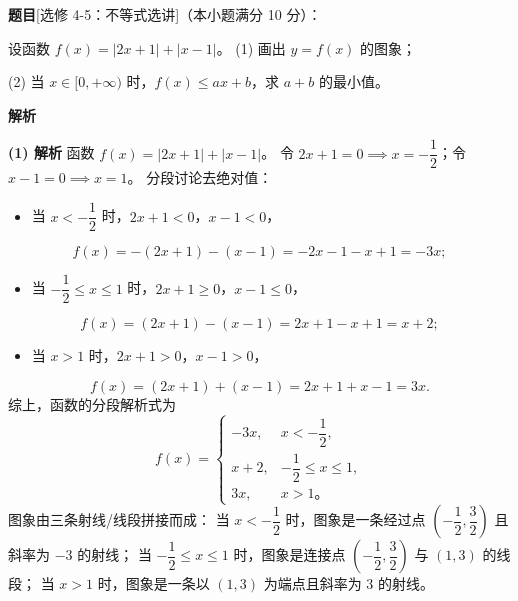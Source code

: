 \begin{answer}

\textbf{题目}[选修 4-5：不等式选讲]（本小题满分 10 分）：

设函数 $f(x) = |2x + 1| + |x - 1|$。
(1) 画出 $y = f(x)$ 的图象；
\nopagebreak[4]
\begin{center}\end{center}
\nopagebreak[4]
(2) 当 $x \in [0, +\infty)$ 时，$f(x) \leqslant ax + b$，求 $a + b$ 的最小值。

\textbf{解析}

\textbf{(1) 解析} 函数 $f(x) = |2x + 1| + |x - 1|$。
令 $2x + 1 = 0 \implies x = -\dfrac12$；令 $x - 1 = 0 \implies x = 1$。
分段讨论去绝对值：
\begin{itemize}
\item 当 $x < -\dfrac12$ 时，$2x + 1 < 0$，$x - 1 < 0$，
\end{itemize}
\nopagebreak[4]
\[f(x) = -(2x + 1) - (x - 1) = -2x - 1 - x + 1 = -3x;\]
\begin{itemize}
\item 当 $-\dfrac12 \leqslant x \leqslant 1$ 时，$2x + 1 \geqslant 0$，$x - 1 \leqslant 0$，
\end{itemize}
\nopagebreak[4]
\[f(x) = (2x + 1) - (x - 1) = 2x + 1 - x + 1 = x + 2;\]
\begin{itemize}
\item 当 $x > 1$ 时，$2x + 1 > 0$，$x - 1 > 0$，
\end{itemize}
\nopagebreak[4]
\[f(x) = (2x + 1) + (x - 1) = 2x + 1 + x - 1 = 3x.\]
综上，函数的分段解析式为
\nopagebreak[4]
\[f(x) = \begin{cases} -3x, & x < -\dfrac12, \\ x + 2, & -\dfrac12 \leqslant x \leqslant 1, \\ 3x, & x > 1\mbox{。} \end{cases}\]
图象由三条射线/线段拼接而成：
当 $x < -\dfrac12$ 时，图象是一条经过点 $\left(-\dfrac12, \dfrac32\right)$ 且斜率为 $-3$ 的射线；
当 $-\dfrac12 \leqslant x \leqslant 1$ 时，图象是连接点 $\left(-\dfrac12, \dfrac32\right)$ 与 $(1, 3)$ 的线段；
当 $x > 1$ 时，图象是一条以 $(1, 3)$ 为端点且斜率为 $3$ 的射线。


\end{answer}
